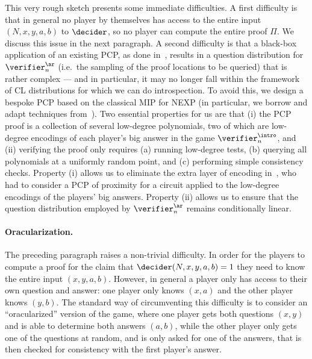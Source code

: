 This very rough sketch presents some immediate difficulties. A first difficulty is that in general no player by themselves has access to the entire input $(N,x,y,a,b)$ to $\decider$, so no player can compute the entire proof $\Pi$. We discuss this issue in the next paragraph. A second difficulty is that a black-box application of an existing PCP, as done in~\cite{NW19}, results in a question distribution for $\verifier_n^\ar$ (i.e.\ the sampling of the proof locations to be queried) that is rather complex --- and in particular, it may no longer fall within the framework of CL distributions for which we can do introspection. 
To avoid this, we design a bespoke PCP based on the classical MIP for NEXP (in particular, we borrow and adapt techniques from~\cite{ben2005simple,ben2006robust}). Two essential properties for us are that (i) the PCP proof is a collection of several low-degree polynomials,
    two of which are low-degree encodings of each player's big answer in the game $\verifier^\intro_n$, and (ii) verifying the proof only requires (a) running low-degree tests, (b) querying all polynomials at a uniformly random point, and (c) performing simple consistency checks. Property (i) allows us to eliminate the extra layer of encoding in~\cite{NW19}, who had to consider a PCP of proximity for a circuit applied to the
low-degree encodings of the players' big answers. Property (ii) allows us to ensure that the question distribution employed by $\verifier_n^\ar$ remains conditionally linear. 

\paragraph{Oracularization.}
The preceding paragraph raises a non-trivial difficulty. In order for the players to compute a proof for the claim that $\decider(N,x,y,a,b)=1$ they need to know the entire input $(x,y,a,b)$. However, in general a player only has access to their own question and answer: one player only knows $(x,a)$ and the other player knows $(y,b)$. The standard way of circumventing this difficulty is to consider an ``oracularized'' version of the game, where one player gets both questions $(x,y)$ and is able to determine both answers $(a,b)$, while the other player only gets one of the questions at random, and is only asked for one of the answers, that is then checked for consistency with the first player's answer. 

